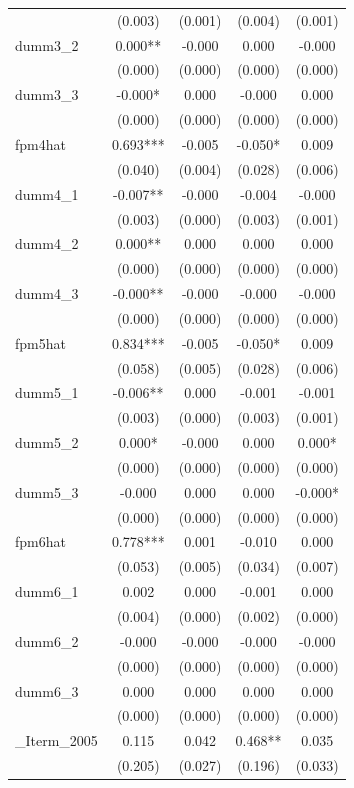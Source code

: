 \documentclass[]{article}
\begin{document}
\begin{tabular}{lcccc}
 & (0.003) & (0.001) & (0.004) & (0.001) \\
dumm3\_2 & 0.000** & -0.000 & 0.000 & -0.000 \\
 & (0.000) & (0.000) & (0.000) & (0.000) \\
dumm3\_3 & -0.000* & 0.000 & -0.000 & 0.000 \\
 & (0.000) & (0.000) & (0.000) & (0.000) \\
fpm4hat & 0.693*** & -0.005 & -0.050* & 0.009 \\
 & (0.040) & (0.004) & (0.028) & (0.006) \\
dumm4\_1 & -0.007** & -0.000 & -0.004 & -0.000 \\
 & (0.003) & (0.000) & (0.003) & (0.001) \\
dumm4\_2 & 0.000** & 0.000 & 0.000 & 0.000 \\
 & (0.000) & (0.000) & (0.000) & (0.000) \\
dumm4\_3 & -0.000** & -0.000 & -0.000 & -0.000 \\
 & (0.000) & (0.000) & (0.000) & (0.000) \\
fpm5hat & 0.834*** & -0.005 & -0.050* & 0.009 \\
 & (0.058) & (0.005) & (0.028) & (0.006) \\
dumm5\_1 & -0.006** & 0.000 & -0.001 & -0.001 \\
 & (0.003) & (0.000) & (0.003) & (0.001) \\
dumm5\_2 & 0.000* & -0.000 & 0.000 & 0.000* \\
 & (0.000) & (0.000) & (0.000) & (0.000) \\
dumm5\_3 & -0.000 & 0.000 & 0.000 & -0.000* \\
 & (0.000) & (0.000) & (0.000) & (0.000) \\
fpm6hat & 0.778*** & 0.001 & -0.010 & 0.000 \\
 & (0.053) & (0.005) & (0.034) & (0.007) \\
dumm6\_1 & 0.002 & 0.000 & -0.001 & 0.000 \\
 & (0.004) & (0.000) & (0.002) & (0.000) \\
dumm6\_2 & -0.000 & -0.000 & -0.000 & -0.000 \\
 & (0.000) & (0.000) & (0.000) & (0.000) \\
dumm6\_3 & 0.000 & 0.000 & 0.000 & 0.000 \\
 & (0.000) & (0.000) & (0.000) & (0.000) \\
\_Iterm\_2005 & 0.115 & 0.042 & 0.468** & 0.035 \\
 & (0.205) & (0.027) & (0.196) & (0.033) \\

\end{tabular}
\end{document}
